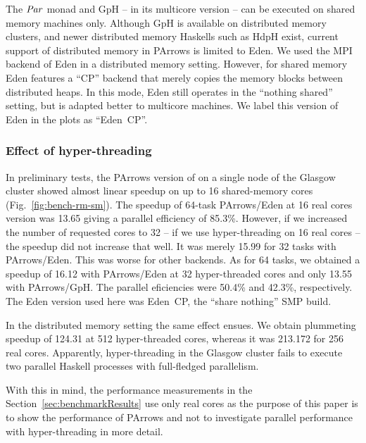 The \ensuremath{\Conid{Par}} monad and GpH -- in its multicore version \cite{Marlow2009} --  can be executed on shared memory machines only.
Although GpH is available on distributed memory
clusters, and newer distributed memory Haskells such as HdpH exist,
current support of distributed memory in PArrows is limited to
Eden. We used the MPI backend of Eden in a distributed memory
setting. However, for shared memory Eden features a ``CP'' backend
that merely copies the memory blocks between distributed heaps. In
this mode, Eden still operates in the ``nothing shared'' setting, but
is adapted better to multicore machines. We label this version of Eden
in the plots as ``Eden~CP''.



\subsubsection{Effect of hyper-threading}

In preliminary tests, the PArrows version of \rmtest on a single node of the Glasgow cluster
showed almost linear speedup on up to 16 shared-memory cores (Fig.~\ref{fig:bench-rm-sm}). The speedup
of 64-task PArrows/Eden at 16 real cores version was 13.65 giving a parallel
efficiency of 85.3\%. However, if we increased the number of
requested cores to 32 -- \ie if we use hyper-threading on 16 real
cores -- the speedup did not increase that well. It was merely 15.99
for 32 tasks with PArrows/Eden. This was worse for other backends.  As
for 64 tasks, we obtained a speedup of 16.12 with PArrows/Eden at 32
hyper-threaded cores and only 13.55 with PArrows/GpH. The parallel eficiencies were 50.4\% and 42.3\%, respectively. The Eden
version used here was Eden~CP, the \enquote{share nothing} SMP build.

In the distributed memory setting the same effect ensues. We obtain
plummeting speedup of 124.31 at 512 hyper-threaded cores, whereas it was
213.172 for 256 real cores. Apparently, hyper-threading in the Glasgow
cluster fails to execute two parallel Haskell processes with full-fledged
parallelism.

With this in mind, the performance measurements in the Section~\ref{sec:benchmarkResults} use only real cores as the purpose of this paper is to show the performance of PArrows and not to investigate parallel performance with hyper-threading in more detail.



